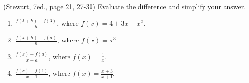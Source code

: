 (Stewart, 7ed., page 21, 27-30)
Evaluate the difference and simplify your answer.
\begin{multicols}{2}
\begin{enumerate}
\item $\frac{f(3+h)-f(3)}{h}$, where $f(x)=4+3x-x^2$.
\item $\frac{f(a+h)-f(a)}{h}$, where $f(x)= x^3$.
\item $\frac{f(x)-f(a)}{x-a}$, where $f(x)=\frac{1}{x}$.
\item $\frac{f(x)-f(1)}{x-1}$, where $f(x)=\frac{x+3}{x+1}$.
\end{enumerate}
\end{multicols}
